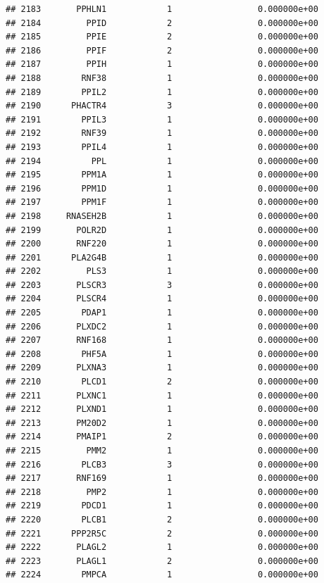 \documentclass[
]{article}
\begin{document}
\begin{verbatim}
## 2183       PPHLN1            1                 0.000000e+00
## 2184         PPID            2                 0.000000e+00
## 2185         PPIE            2                 0.000000e+00
## 2186         PPIF            2                 0.000000e+00
## 2187         PPIH            1                 0.000000e+00
## 2188        RNF38            1                 0.000000e+00
## 2189        PPIL2            1                 0.000000e+00
## 2190      PHACTR4            3                 0.000000e+00
## 2191        PPIL3            1                 0.000000e+00
## 2192        RNF39            1                 0.000000e+00
## 2193        PPIL4            1                 0.000000e+00
## 2194          PPL            1                 0.000000e+00
## 2195        PPM1A            1                 0.000000e+00
## 2196        PPM1D            1                 0.000000e+00
## 2197        PPM1F            1                 0.000000e+00
## 2198     RNASEH2B            1                 0.000000e+00
## 2199       POLR2D            1                 0.000000e+00
## 2200       RNF220            1                 0.000000e+00
## 2201      PLA2G4B            1                 0.000000e+00
## 2202         PLS3            1                 0.000000e+00
## 2203       PLSCR3            3                 0.000000e+00
## 2204       PLSCR4            1                 0.000000e+00
## 2205        PDAP1            1                 0.000000e+00
## 2206       PLXDC2            1                 0.000000e+00
## 2207       RNF168            1                 0.000000e+00
## 2208        PHF5A            1                 0.000000e+00
## 2209       PLXNA3            1                 0.000000e+00
## 2210        PLCD1            2                 0.000000e+00
## 2211       PLXNC1            1                 0.000000e+00
## 2212       PLXND1            1                 0.000000e+00
## 2213       PM20D2            1                 0.000000e+00
## 2214       PMAIP1            2                 0.000000e+00
## 2215         PMM2            1                 0.000000e+00
## 2216        PLCB3            3                 0.000000e+00
## 2217       RNF169            1                 0.000000e+00
## 2218         PMP2            1                 0.000000e+00
## 2219        PDCD1            1                 0.000000e+00
## 2220        PLCB1            2                 0.000000e+00
## 2221      PPP2R5C            2                 0.000000e+00
## 2222       PLAGL2            1                 0.000000e+00
## 2223       PLAGL1            2                 0.000000e+00
## 2224        PMPCA            1                 0.000000e+00

\end{verbatim}
\end{document}
